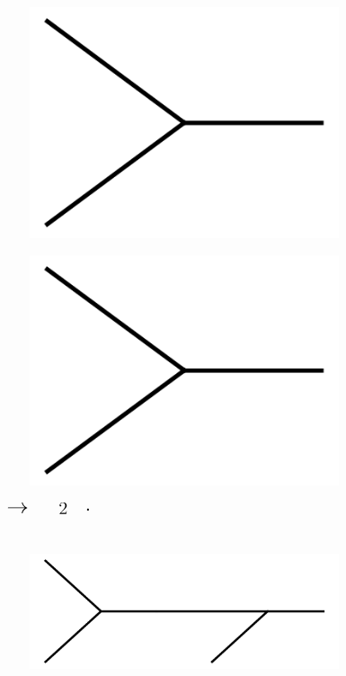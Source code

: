 \documentclass[11pt,a4paper,twoside,pdf]{article}
\numberwithin{equation}{section}
\begin{document}
\begin{figure}[h!]
  \centering
    \begin{subfigure}[t]{.15\textwidth}
    \includegraphics[width=\textwidth]{plots/1to2.png}
    \end{subfigure}%
    \begin{subfigure}[t]{.15\textwidth}
    \includegraphics[width=\textwidth]{plots/1to2.png}
    \end{subfigure}%
    $\displaystyle \quad %
    \raisebox{3\height}{\LARGE $\to$}\quad $
    $\displaystyle \quad %
    \raisebox{2\height}{\Large $2\quad\cdot$} $
    \begin{subfigure}[t]{.3\textwidth}
    \includegraphics[width=\textwidth]{plots/1to3.png}
    \end{subfigure}%
\end{figure}
\end{document}
